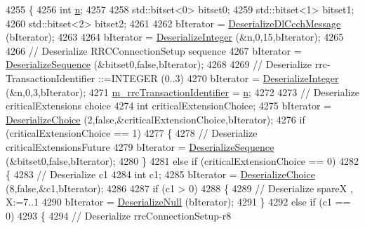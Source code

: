 \begin{DoxyCode}
4255 \{
4256   \textcolor{keywordtype}{int} \hyperlink{namespacesample-rng-plot_aeb5ee5c431e338ef39b7ac5431242e1d}{n};
4257 
4258   std::bitset<0> bitset0;
4259   std::bitset<1> bitset1;
4260   std::bitset<2> bitset2;
4261 
4262   bIterator = \hyperlink{classns3_1_1RrcDlCcchMessage_a113d0d3c8e4cf337e3bc555c20079aff}{DeserializeDlCcchMessage} (bIterator);
4263 
4264   bIterator = \hyperlink{classns3_1_1Asn1Header_a49802c9af30018b078150e866b6ecae2}{DeserializeInteger} (&n,0,15,bIterator);
4265 
4266   \textcolor{comment}{// Deserialize RRCConnectionSetup sequence}
4267   bIterator = \hyperlink{classns3_1_1Asn1Header_a58c68bb97ba3fe2e8fcdd7c208d672b2}{DeserializeSequence} (&bitset0,\textcolor{keyword}{false},bIterator);
4268 
4269   \textcolor{comment}{// Deserialize rrc-TransactionIdentifier ::=INTEGER (0..3)}
4270   bIterator = \hyperlink{classns3_1_1Asn1Header_a49802c9af30018b078150e866b6ecae2}{DeserializeInteger} (&n,0,3,bIterator);
4271   \hyperlink{classns3_1_1RrcConnectionSetupHeader_a623f0298c84418c5c03c19a070118583}{m\_rrcTransactionIdentifier} = \hyperlink{namespacesample-rng-plot_aeb5ee5c431e338ef39b7ac5431242e1d}{n};
4272 
4273   \textcolor{comment}{// Deserialize criticalExtensions choice}
4274   \textcolor{keywordtype}{int} criticalExtensionChoice;
4275   bIterator = \hyperlink{classns3_1_1Asn1Header_a0af5881f07a0549a8693a1b75c229a90}{DeserializeChoice} (2,\textcolor{keyword}{false},&criticalExtensionChoice,bIterator);
4276   \textcolor{keywordflow}{if} (criticalExtensionChoice == 1)
4277     \{
4278       \textcolor{comment}{// Deserialize criticalExtensionsFuture}
4279       bIterator = \hyperlink{classns3_1_1Asn1Header_a58c68bb97ba3fe2e8fcdd7c208d672b2}{DeserializeSequence} (&bitset0,\textcolor{keyword}{false},bIterator);
4280     \}
4281   \textcolor{keywordflow}{else} \textcolor{keywordflow}{if} (criticalExtensionChoice == 0)
4282     \{
4283       \textcolor{comment}{// Deserialize c1}
4284       \textcolor{keywordtype}{int} c1;
4285       bIterator = \hyperlink{classns3_1_1Asn1Header_a0af5881f07a0549a8693a1b75c229a90}{DeserializeChoice} (8,\textcolor{keyword}{false},&c1,bIterator);
4286 
4287       \textcolor{keywordflow}{if} (c1 > 0)
4288         \{
4289           \textcolor{comment}{// Deserialize spareX , X:=7..1}
4290           bIterator = \hyperlink{classns3_1_1Asn1Header_a29bd4508f3f1ef636b3480f524fac0ce}{DeserializeNull} (bIterator);
4291         \}
4292       \textcolor{keywordflow}{else} \textcolor{keywordflow}{if} (c1 == 0)
4293         \{
4294           \textcolor{comment}{// Deserialize rrcConnectionSetup-r8}

\end{DoxyCode}
